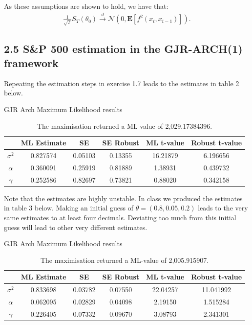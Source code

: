 \documentclass[11pt,a4paper,oneside]{article}
\newcommand{\lp}{\left(}
\newcommand{\rp}{\right)}
\newcommand{\rb}{\right]}
\newcommand{\lb}{\left[}
\newcommand{\ee}{\mathbf{E}}
\newcommand{\nnn}{\mathcal{N}}
\begin{document}
As these assumptions are shown to hold, we have that:
\begin{align}
    \frac{1}{\sqrt{T}}S_T\lp \theta_0 \rp \overset{d}{\rightarrow}\nnn\lp 0, \ee\lb f^2\lp x_t, x_{t-1}\rp\rb\rp.
\end{align}

\subsection{2.5 S\&P 500 estimation in the GJR-ARCH(1) framework}

Repeating the estimation steps in exercise 1.7 leads to the estimates in table 2 below.
\begin{table}[ht]
    \centering
    \caption{GJR Arch Maximum Likelihood results}
    \begin{tabular}{c|ccccc}  
    \toprule
                    &   ML Estimate &   SE      &   SE Robust   &   ML t-value  &   Robust t-value
    \\ \midrule
        $\sigma^2$  &   0.827574    &   0.05103 &   0.13355     &   16.21879    &   6.196656
    \\
        $\alpha$    &   0.360091    &   0.25919 &   0.81889     &   1.38931     &   0.439732
    \\
        $\gamma$    &   0.252586    &   0.82697 &   0.73821     &   0.88020     &   0.342158
    \\ \midrule
    \end{tabular}
    \label{tab:ml_gjr_arch}
    \caption*{The maximisation returned a ML-value of 2,029.17384396.}
\end{table}

Note that the estimates are highly unstable. In class we produced the estimates in table 3 below. Making an initial guess of $\theta = \lp 0.8, 0.05, 0.2\rp$ leads to the very same estimates to at least four decimals. Deviating too much from this initial guess will lead to other very different estimates.
\begin{table}[ht]
    \centering
    \caption{GJR Arch Maximum Likelihood results}
    \begin{tabular}{c|ccccc}  
    \toprule
                    &   ML Estimate &   SE      &   SE Robust   &   ML t-value  &   Robust t-value
    \\ \midrule
        $\sigma^2$  &   0.833698    &   0.03782 &   0.07550     &   22.04257    &   11.041992
    \\
        $\alpha$    &   0.062095    &   0.02829 &   0.04098     &   2.19150     &   1.515284
    \\
        $\gamma$    &   0.226405    &   0.07332 &   0.09670     &   3.08793     &   2.341301
    \\ \midrule
    \end{tabular}
    \label{tab:ml_gjr_arch_2}
    \caption*{The maximisation returned a ML-value of 2,005.915907.}
\end{table}
\end{document}
